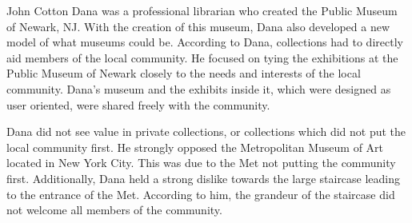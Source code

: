 \documentclass[11pt]{article}
\begin{document}
\doublespacing
John Cotton Dana was a professional librarian who created the Public Museum of Newark, NJ. With the creation of this museum, Dana also developed a new model of what museums could be. According to Dana, collections had to directly aid members of the local community. He focused on tying the exhibitions at the Public Museum of Newark closely to the needs and interests of the local community. Dana's museum and the exhibits inside it, which were designed as user oriented, were shared freely with the community.

Dana did not see value in private collections, or collections which did not put the local community first. He strongly opposed the Metropolitan Museum of Art located in New York City. This was due to the Met not putting the community first. Additionally, Dana held a strong dislike towards the large staircase leading to the entrance of the Met. According to him, the grandeur of the staircase did not welcome all members of the community.
\end{document}
